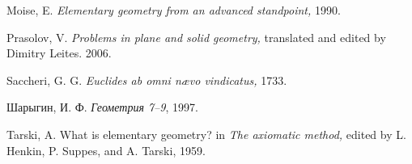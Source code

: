 \begin{thebibliography}{52}
Moise, E.
\textit{Elementary geometry from an advanced standpoint,}  
1990.

Prasolov, V.
\textit{Problems in plane and solid geometry,} 
translated and edited by Dimitry Leites. 2006.

Saccheri, G. G.
\textit{Euclides ab omni n\ae vo vindicatus,} 
1733.


\begin{otherlanguage}{russian}
Шарыгин, И. Ф.
\textit{Геометрия 7--9}, %
1997.
\end{otherlanguage}

 Tarski, A.
What is elementary geometry? in
\textit{The axiomatic method,} edited by L. Henkin, P. Suppes, and A. Tarski,
1959.



\end{thebibliography}
